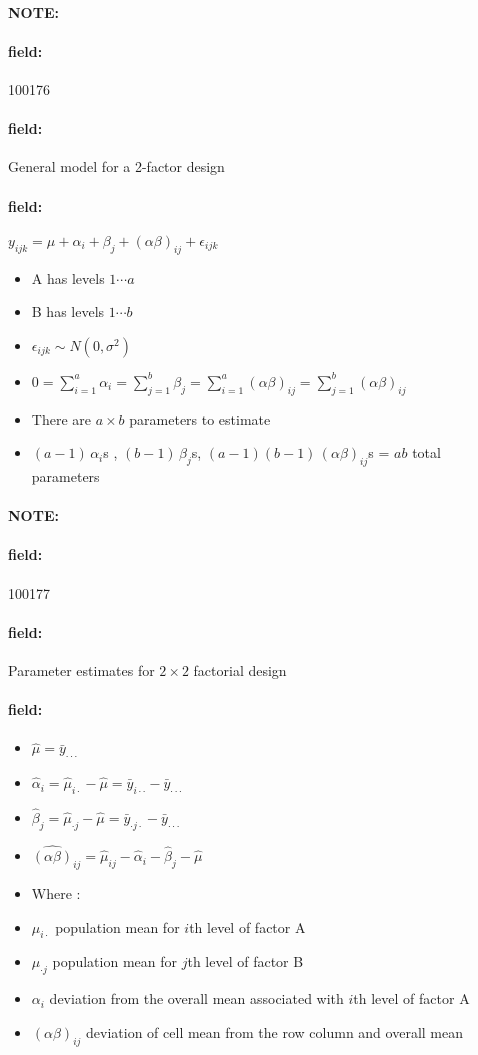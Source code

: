 \documentclass[12pt]{article}
\newenvironment{note}{\paragraph{NOTE:}}{}
\newenvironment{field}{\paragraph{field:}}{}
\begin{document}
\begin{note}
 \begin{field}
  \tiny 100176
 \end{field}
 \begin{field}
  General model for a 2-factor design
 \end{field}
 \begin{field}
  $y_{ijk} = \mu + \alpha_i + \beta_j + (\alpha\beta)_{ij} + \epsilon_{ijk}$
  \begin{itemize}
   \item A has levels $1 \cdots a$
   \item B has levels $1 \cdots b$
   \item $\epsilon_{ijk} \sim N(0,\sigma^2)$
   \item $0 = \sum_{i=1}^a \alpha_i = \sum_{j=1}^b \beta_j = \sum_{i=1}^a (\alpha\beta)_{ij} = \sum_{j=1}^b (\alpha\beta)_{ij}$
   \item There are $a \times b $ parameters to estimate
   \item $(a-1)\, \alpha_i$s , $(b-1)\, \beta_j$s, $(a-1)(b-1) \, (\alpha\beta)_{ij}$s = $ab$ total parameters
  \end{itemize}
 \end{field}
\end{note}

\begin{note}
 \begin{field}
  \tiny 100177
 \end{field}
 \begin{field}
  Parameter estimates for $2 \times 2$ factorial design
 \end{field}
 \begin{field}
  \begin{itemize}
   \item $\hat{\mu} = \bar{y}_{\cdot\cdot \cdot}$
   \item $\hat{\alpha}_i = \hat{\mu}_{i\cdot} - \hat{\mu} = \bar{y}_{i\cdot \cdot} - \bar{y}_{\cdot \cdot \cdot }$
   \item $\hat{\beta}_j =\hat{\mu}_{\cdot j} - \hat{\mu} = \bar{y}_{\cdot j \cdot} - \bar{y}_{\cdot \cdot \cdot } $
   \item $\hat{(\alpha\beta)}_{ij} = \hat{\mu}_{ij} - \hat{\alpha}_i - \hat{\beta}_j - \hat{\mu}$
   \item Where :


   \item $\mu_{i\cdot }$ population mean for $i$th level of factor A
   \item $\mu_{\cdot j}$ population mean for $j$th level of factor B
   \item $\alpha_i$ deviation from the overall mean associated with $i$th level of factor A
   \item $(\alpha\beta)_{ij}$ deviation of cell mean from the row column and overall mean
  \end{itemize}
 \end{field}
\end{note}
\end{document}
